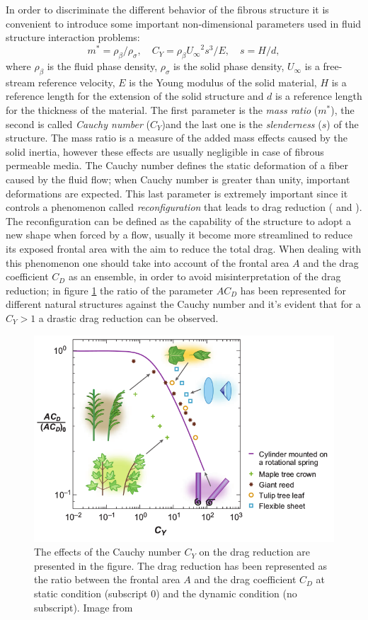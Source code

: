 In order to discriminate the different behavior of the fibrous structure it is convenient to introduce some important non-dimensional parameters used in fluid structure interaction problems:
$$ m^* = \rho_{\beta} / \rho_{\sigma}, \quad C_Y= \rho_{\beta} {U_{\infty}}^2 s^3 / E, \quad s = H/d, $$
where $\rho_{\beta}$ is the fluid phase density, $\rho_{\sigma}$ is the solid phase density, $U_{\infty}$ is a free-stream reference velocity, $E$ is the Young modulus of the solid material, $H$ is a reference length for the extension of the solid structure and $d$ is a reference length for the thickness of the material.
The first parameter is the \textit{mass ratio} ($m^*$), the second is called \textit{Cauchy number} ($C_Y$)and the last one is the \textit{slenderness} ($s$) of the structure.
The mass ratio is a measure of the added mass effects caused by the solid inertia, however these effects are usually negligible in case of fibrous permeable media.
The Cauchy number defines the static deformation of a fiber caused by the fluid flow; when Cauchy number is greater than unity, important deformations are expected.
This last parameter is extremely important since it controls a phenomenon called \textit{reconfiguration} that leads to drag reduction (\citet{gosselin2011drag} and \citet{alvarado2017nature}).
The reconfiguration can be defined as the capability of the structure to adopt a new shape when forced by a flow, usually it become more streamlined to reduce its exposed frontal area with the aim to reduce the total drag.
When dealing with this phenomenon one should take into account of the frontal area $A$ and the drag coefficient $C_D$ as an ensemble, in order to avoid misinterpretation of the drag reduction; in figure \ref{fig:cycd} the ratio of the parameter $AC_D$ has been represented for different natural structures against the Cauchy number and it's evident that for a $C_Y>1$ a drastic drag reduction can be observed.

\begin{figure}[h]
	\centering
	\includegraphics[width=0.7\linewidth]{chapter_1/cy_cd}
	\caption{The effects of the Cauchy number $C_Y$ on the drag reduction are presented in the figure. The drag reduction has been represented as the ratio between the frontal area $A$ and the drag coefficient $C_D$ at static condition (subscript $0$) and the dynamic condition (no subscript). Image from \citet{de2008effects}}
	\label{fig:cycd}
\end{figure}

